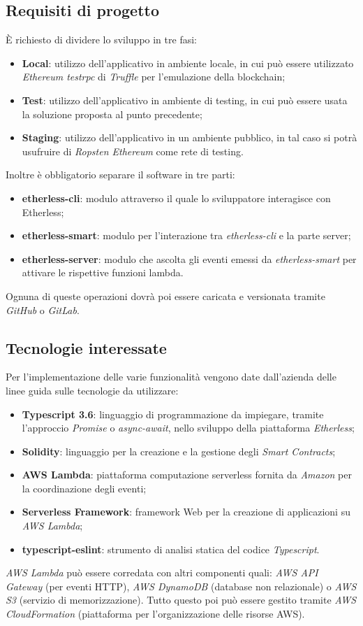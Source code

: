 \subsection{Requisiti di progetto}
È richiesto di dividere lo sviluppo in tre fasi:
\begin{itemize}
   	\item \textbf{Local}: utilizzo dell'applicativo in ambiente locale, in cui può essere utilizzato \textit{Ethereum testrpc} di \textit{Truffle} per
   	l'emulazione della blockchain;
   	\item \textbf{Test}: utilizzo dell'applicativo in ambiente di testing, in cui può essere usata la soluzione proposta al punto precedente;
   	\item \textbf{Staging}: utilizzo dell'applicativo in un ambiente pubblico, in tal caso si potrà usufruire di \textit{Ropsten Ethereum} come rete di testing.
\end{itemize}
Inoltre è obbligatorio separare il software in tre parti:
\begin{itemize}
   	\item \textbf{etherless-cli}: modulo attraverso il quale lo sviluppatore interagisce con Etherless;
   	\item \textbf{etherless-smart}: modulo per l'interazione tra \textit{etherless-cli} e la parte server;
   	\item \textbf{etherless-server}: modulo che ascolta gli eventi emessi da \textit{etherless-smart} per attivare le rispettive funzioni lambda. 
\end{itemize}
Ognuna di queste operazioni dovrà poi essere caricata e versionata tramite \textit{GitHub} o \textit{GitLab}.
\subsection{Tecnologie interessate}
    Per l'implementazione delle varie funzionalità vengono date dall'azienda delle linee guida sulle tecnologie da utilizzare:
    \begin{itemize}
        \item \textbf{Typescript 3.6}: linguaggio di programmazione da impiegare, tramite l'approccio \textit{Promise} o \textit{async-await}, nello sviluppo della piattaforma \textit{Etherless};
        \item \textbf{Solidity}: linguaggio per la creazione e la gestione degli \textit{Smart Contracts};
        \item \textbf{AWS Lambda}: piattaforma computazione serverless fornita da \textit{Amazon} per la coordinazione degli eventi;
        \item \textbf{Serverless Framework}: framework Web per la creazione di applicazioni su \textit{AWS Lambda};
        \item \textbf{typescript-eslint}: strumento di analisi statica del codice \textit{Typescript}.
    \end{itemize}
    \textit{AWS Lambda} può essere corredata con altri componenti quali: \textit{AWS API Gateway} (per eventi HTTP), \textit{AWS DynamoDB} (database non relazionale)
    o \textit{AWS S3} (servizio di memorizzazione). Tutto questo poi può essere gestito tramite \textit{AWS CloudFormation} (piattaforma per l'organizzazione delle
    risorse AWS).
